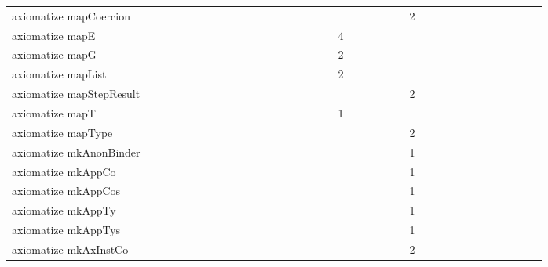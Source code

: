 {\begin{tabular}{l|rrr|rrr|rrr}
axiomatize mapCoercion &  &  &  &  &  &  &  &  &  &  &  &  &  &  &  &  &  &  &  &  &  &  &  & 2 &  &  &  &  &  &  &  &  &  &  &  & \\
axiomatize mapE &  &  &  &  &  &  &  &  &  &  &  &  &  &  &  &  &  & 4 &  &  &  &  &  &  &  &  &  &  &  &  &  &  &  &  &  & \\
axiomatize mapG &  &  &  &  &  &  &  &  &  &  &  &  &  &  &  &  &  & 2 &  &  &  &  &  &  &  &  &  &  &  &  &  &  &  &  &  & \\
axiomatize mapList &  &  &  &  &  &  &  &  &  &  &  &  &  &  &  &  &  & 2 &  &  &  &  &  &  &  &  &  &  &  &  &  &  &  &  &  & \\
axiomatize mapStepResult &  &  &  &  &  &  &  &  &  &  &  &  &  &  &  &  &  &  &  &  &  &  &  & 2 &  &  &  &  &  &  &  &  &  &  &  & \\
axiomatize mapT &  &  &  &  &  &  &  &  &  &  &  &  &  &  &  &  &  & 1 &  &  &  &  &  &  &  &  &  &  &  &  &  &  &  &  &  & \\
axiomatize mapType &  &  &  &  &  &  &  &  &  &  &  &  &  &  &  &  &  &  &  &  &  &  &  & 2 &  &  &  &  &  &  &  &  &  &  &  & \\
axiomatize mkAnonBinder &  &  &  &  &  &  &  &  &  &  &  &  &  &  &  &  &  &  &  &  &  &  &  & 1 &  &  &  &  &  &  &  &  &  &  &  & \\
axiomatize mkAppCo &  &  &  &  &  &  &  &  &  &  &  &  &  &  &  &  &  &  &  &  &  &  &  & 1 &  &  &  &  &  &  &  &  &  &  &  & \\
axiomatize mkAppCos &  &  &  &  &  &  &  &  &  &  &  &  &  &  &  &  &  &  &  &  &  &  &  & 1 &  &  &  &  &  &  &  &  &  &  &  & \\
axiomatize mkAppTy &  &  &  &  &  &  &  &  &  &  &  &  &  &  &  &  &  &  &  &  &  &  &  & 1 &  &  &  &  &  &  &  &  &  &  &  & \\
axiomatize mkAppTys &  &  &  &  &  &  &  &  &  &  &  &  &  &  &  &  &  &  &  &  &  &  &  & 1 &  &  &  &  &  &  &  &  &  &  &  & \\
axiomatize mkAxInstCo &  &  &  &  &  &  &  &  &  &  &  &  &  &  &  &  &  &  &  &  &  &  &  & 2 &  &  &  &  &  &  &  &  &  &  &  & \\

\end{tabular}}
